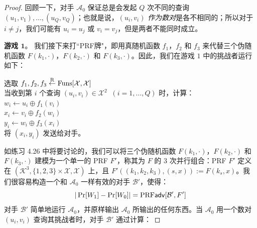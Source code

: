 \begin{proof}
\vspace{5pt}

\noindent
回顾一下，对手 $\mathcal{A}_0$ 保证总是会发起 $Q$ 次不同的查询 $(u_1,v_1),\dots,(u_Q,v_Q)$；也就是说，$(u_i,v_i)$ \emph{作为数对}是各不相同的；所以对于 $i\neq j$，我们可能有 $u_i=u_j$ 或 $v_i=v_j$，但是两者不能同时成立。

\vspace{5pt}

\noindent
\textbf{游戏 $\mathbf{1}$}。
我们接下来打``PRF牌"，即用真随机函数 $f_1$，$f_2$ 和 $f_3$ 来代替三个伪随机函数 $F(k_1,\cdot)$，$F(k_2,\cdot)$ 和 $F(k_3,\cdot)$。因此，我们在游戏 $1$ 中的挑战者运行如下：

\vspace{5pt}

\hspace*{5pt} 选取 $f_1,f_2,f_3\overset{\rm R}\leftarrow{\rm Funs}[\mathcal{X},\mathcal{X}]$\\
\hspace*{26pt} 当收到第 $i$ 个查询 $(u_i,v_i)\in\mathcal{X}^2\;\;(i=1,\dots,Q)$ 时，计算：\\
\hspace*{50pt} $w_i\leftarrow u_i\oplus f_1(v_i)$\\
\hspace*{50pt} $x_i\leftarrow v_i\oplus f_2(w_i)$\\
\hspace*{50pt} $y_i\leftarrow w_i\oplus f_3(x_i)$\\
\hspace*{50pt} 将 $(x_i,y_i)$ 发送给对手。

\vspace{5pt}

如练习 4.26 中将要讨论的，我们可以将三个伪随机函数 $F(k_1,\cdot)$，$F(k_2,\cdot)$ 和 $F(k_3,\cdot)$ 建模为一个单一的 PRF $F'$，称其为 $F$ 的 $3$ 次并行组合：PRF $F'$ 定义在 $(\mathcal{K}^3,\{1,2,3\}\times\mathcal{X},\mathcal{X})$ 上，且 $F'((k_1,k_2,k_3),(s,x)):=F(k_s,x)$。我们很容易构造一个和 $\mathcal{A}_0$ 一样有效的对手 $\mathcal{B}'$，使得：
\begin{equation}\label{eq:4-24}
|\Pr[W_1]-\Pr[W_0]|={\rm PRF\mathsf{adv}}[\mathcal{B}', F']
\end{equation}
对手 $\mathcal{B}'$ 简单地运行 $\mathcal{A}_0$，并原样输出 $\mathcal{A}_0$ 所输出的任何东西。当 $\mathcal{A}_0$ 用一个数对 $(u_i,v_i)$ 查询其挑战者时，对手 $\mathcal{B}'$ 通过计算：

\vspace{5pt}


\end{proof}

